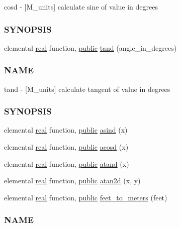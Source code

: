 \begin{DoxyCompactItemize}
\begin{DoxyCompactList}
cosd -\/ \mbox{[}M\+\_\+units\mbox{]} calculate sine of value in degrees \subsubsection*{S\+Y\+N\+O\+P\+S\+IS}\end{DoxyCompactList}\item 
elemental \hyperlink{read__watch_83_8txt_abdb62bde002f38ef75f810d3a905a823}{real} function, \hyperlink{M__stopwatch_83_8txt_a2f74811300c361e53b430611a7d1769f}{public} \hyperlink{namespacem__units_ac2c6550d996061015c6b4178048e4967}{tand} (angle\+\_\+in\+\_\+degrees)
\begin{DoxyCompactList}\small\item\em \subsubsection*{N\+A\+ME}

tand -\/ \mbox{[}M\+\_\+units\mbox{]} calculate tangent of value in degrees \subsubsection*{S\+Y\+N\+O\+P\+S\+IS}\end{DoxyCompactList}\item 
elemental \hyperlink{read__watch_83_8txt_abdb62bde002f38ef75f810d3a905a823}{real} function, \hyperlink{M__stopwatch_83_8txt_a2f74811300c361e53b430611a7d1769f}{public} \hyperlink{namespacem__units_ad2b3de1ae68e3090d6c5793fc50dce77}{asind} (x)
\item 
elemental \hyperlink{read__watch_83_8txt_abdb62bde002f38ef75f810d3a905a823}{real} function, \hyperlink{M__stopwatch_83_8txt_a2f74811300c361e53b430611a7d1769f}{public} \hyperlink{namespacem__units_af4446b30251a8832b90b9c6c596104d6}{acosd} (x)
\item 
elemental \hyperlink{read__watch_83_8txt_abdb62bde002f38ef75f810d3a905a823}{real} function, \hyperlink{M__stopwatch_83_8txt_a2f74811300c361e53b430611a7d1769f}{public} \hyperlink{namespacem__units_ac54e5d4cedc06c56d0de8e0138781be9}{atand} (x)
\item 
elemental \hyperlink{read__watch_83_8txt_abdb62bde002f38ef75f810d3a905a823}{real} function, \hyperlink{M__stopwatch_83_8txt_a2f74811300c361e53b430611a7d1769f}{public} \hyperlink{namespacem__units_a09403aaa43be5c74f7b9a3c2df2d1460}{atan2d} (x, y)
\item 
elemental \hyperlink{read__watch_83_8txt_abdb62bde002f38ef75f810d3a905a823}{real} function, \hyperlink{M__stopwatch_83_8txt_a2f74811300c361e53b430611a7d1769f}{public} \hyperlink{namespacem__units_a6b2e3302766d3ee6edbb2d6d3c284e96}{feet\+\_\+to\+\_\+meters} (feet)
\begin{DoxyCompactList}\small\item\em \subsubsection*{N\+A\+ME}


\end{DoxyCompactList}
\end{DoxyCompactItemize}
